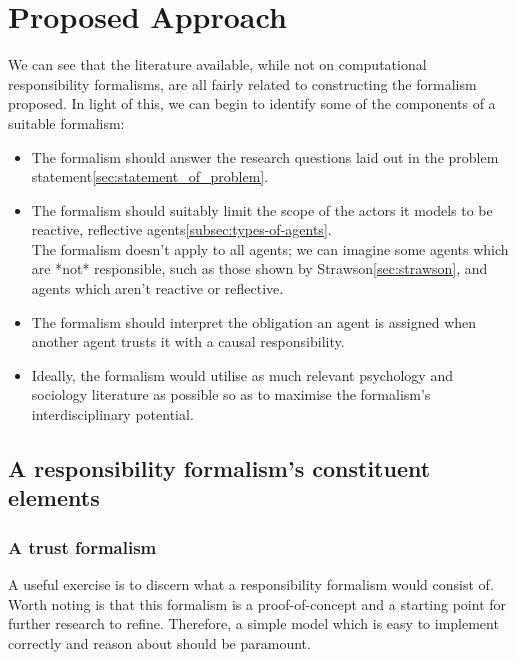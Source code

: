 \section{Proposed Approach}\label{sec:proposed_approach}

We can see that the literature available, while not on computational responsibility formalisms, are all fairly related to constructing the formalism proposed. In light of this, we can begin to identify some of the components of a suitable formalism:\par

\begin{itemize}
    \item The formalism should answer the research questions laid out in the problem statement\cref{sec:statement_of_problem}.
    \item The formalism should suitably limit the scope of the actors it models to be reactive, reflective agents\cref{subsec:types-of-agents}.\\
        The formalism doesn't apply to all agents; we can imagine some agents which are *not* responsible, such as those shown by Strawson\cref{sec:strawson}, and agents which aren't reactive or reflective.
    \item The formalism should interpret the obligation an agent is assigned when another agent trusts it with a causal responsibility.
    \item Ideally, the formalism would utilise as much relevant psychology and sociology literature as possible so as to maximise the formalism's interdisciplinary potential.
\end{itemize}

\subsection{A responsibility formalism's constituent elements}
\subsubsection{A trust formalism}
A useful exercise is to discern what a responsibility formalism would consist of. Worth noting is that this formalism is a proof-of-concept and a starting point for further research to refine. Therefore, a simple model which is easy to implement correctly and reason about should be paramount.\par

